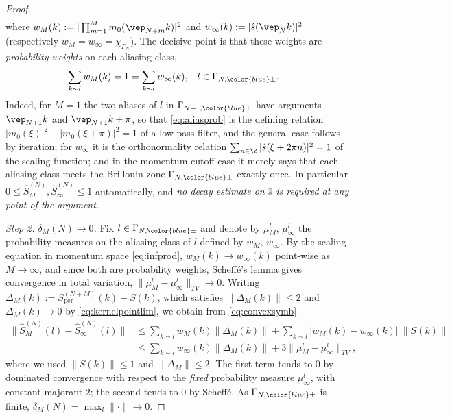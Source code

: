 \documentclass[a4paper, 11pt]{article}
\DeclareMathOperator{\1}{\mathds{1}}
\DeclareMathOperator{\per}{per}
\begin{document}
\begin{proof}
\begin{align}
\end{align}
where $w_{M}(k) := |\prod_{m=1}^{M}m_{0}(\vep_{N+m}k)|^{2}$ and $w_{\infty}(k) := |\hat{s}(\vep_{N}k)|^{2}$ (respectively $w_{M}=w_{\infty}=\chi_{\Gamma_{N}}$). The decisive point is that these weights are \emph{probability weights} on each aliasing class,
\begin{align}
\label{eq:aliasprob}
\sum_{k\sim l}w_{M}(k) & = 1 = \sum_{k\sim l}w_{\infty}(k), & l & \in\Gamma_{N,{\color{blue}\pm}}.
\end{align}
Indeed, for $M=1$ the two aliases of $l$ in $\Gamma_{N+1,{\color{blue}\pm}}$ have arguments $\vep_{N+1}k$ and $\vep_{N+1}k+\pi$, so that \eqref{eq:aliasprob} is the defining relation $|m_{0}(\xi)|^{2}+|m_{0}(\xi+\pi)|^{2}=1$ of a low-pass filter, and the general case follows by iteration; for $w_{\infty}$ it is the orthonormality relation $\sum_{n\in\Z}|\hat{s}(\xi+2\pi n)|^{2}=1$ of the scaling function; and in the momentum-cutoff case it merely says that each aliasing class meets the Brillouin zone $\Gamma_{N,{\color{blue}\pm}}$ exactly once. In particular $0\leq\hat{S}^{(N)}_{M},\hat{S}^{(N)}_{\infty}\leq1$ automatically, and \emph{no decay estimate on $\hat{s}$ is required at any point of the argument.}

\emph{Step 2: $\delta_{M}(N)\rightarrow0$.} Fix $l\in\Gamma_{N,{\color{blue}\pm}}$ and denote by $\mu^{l}_{M}$, $\mu^{l}_{\infty}$ the probability measures on the aliasing class of $l$ defined by $w_{M}$, $w_{\infty}$. By the scaling equation in momentum space \eqref{eq:infprod}, $w_{M}(k)\rightarrow w_{\infty}(k)$ point-wise as $M\rightarrow\infty$, and since both are probability weights, Scheffé's lemma gives convergence in total variation, $\|\mu^{l}_{M}-\mu^{l}_{\infty}\|_{TV}\rightarrow0$. Writing $\Delta_{M}(k) := S^{(N+M)}_{\per}(k)-S(k)$, which satisfies $\|\Delta_{M}(k)\|\leq2$ and $\Delta_{M}(k)\rightarrow0$ by \eqref{eq:kernelpointlim}, we obtain from \eqref{eq:convexsymb}
\begin{align*}
\big\|\hat{S}^{(N)}_{M}(l)-\hat{S}^{(N)}_{\infty}(l)\big\| & \leq \sum_{k\sim l}w_{M}(k)\|\Delta_{M}(k)\| + \sum_{k\sim l}|w_{M}(k)-w_{\infty}(k)|\!\ \|S(k)\| \\
& \leq \sum_{k\sim l}w_{\infty}(k)\|\Delta_{M}(k)\| + 3\|\mu^{l}_{M}-\mu^{l}_{\infty}\|_{TV},
\end{align*}
where we used $\|S(k)\|\leq1$ and $\|\Delta_{M}\|\leq2$. The first term tends to $0$ by dominated convergence with respect to the \emph{fixed} probability measure $\mu^{l}_{\infty}$, with constant majorant $2$; the second tends to $0$ by Scheffé. As $\Gamma_{N,{\color{blue}\pm}}$ is finite, $\delta_{M}(N) = \max_{l}\|\cdot\|\rightarrow0$.


\end{proof}
\end{document}
